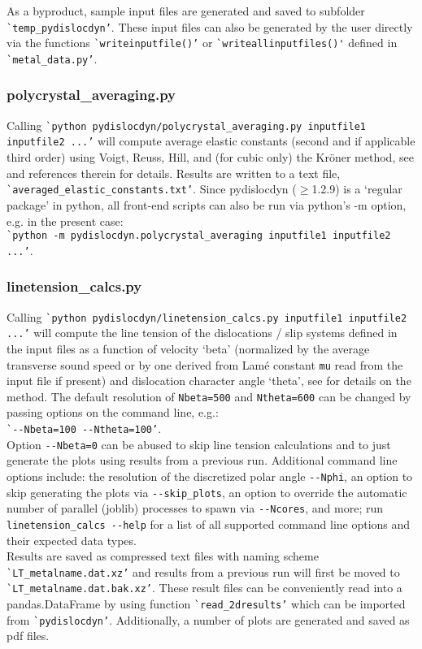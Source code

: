 \documentclass[11pt,letterpaper,oneside,pdftex]{article}
\begin{document}
As a byproduct, sample input files are generated and saved to subfolder \verb|`temp_pydislocdyn’|.
These input files can also be generated by the user directly via the functions \verb|`writeinputfile()’| or \verb|`writeallinputfiles()'| defined in \verb|`metal_data.py’|.


\subsubsection{polycrystal\_averaging.py}

Calling \verb|`python pydislocdyn/polycrystal_averaging.py inputfile1 inputfile2 ...’| will compute average elastic constants (second and if applicable third order) using Voigt, Reuss, Hill, and (for cubic only) the Kr{\"o}ner method, see \cite{Blaschke:2017Poly} and references therein for details.
Results are written to a text file,
\verb|`averaged_elastic_constants.txt’|.
Since pydislocdyn ($\ge$1.2.9) is a `regular package' in python, all front-end scripts can also be run via python's -m option, e.g. in the present case:\\
\verb|`python -m pydislocdyn.polycrystal_averaging inputfile1 inputfile2 ...’|.



\subsubsection{linetension\_calcs.py}

Calling \verb|`python pydislocdyn/linetension_calcs.py inputfile1 inputfile2 ...’| will compute the line tension of the dislocations / slip systems defined in the input files as a function of velocity ‘beta’ (normalized by the average transverse sound speed or by one derived from Lam\'e constant \verb|mu| read from the input file if present) and dislocation character angle ‘theta’, see \cite{Blaschke:2017lten} for details on the method.
The default resolution of \verb|Nbeta=500| and \verb|Ntheta=600| can be changed by passing options on the command line, e.g.:
\\\verb|`--Nbeta=100 --Ntheta=100’|.\\
Option \verb|--Nbeta=0| can be abused to skip line tension calculations and to just generate the plots using results from a previous run. 
Additional command line options include:
the resolution of the discretized polar angle \verb|--Nphi|,
an option to skip generating the plots via \verb|--skip_plots|,
an option to override the automatic number of parallel (joblib) processes to spawn via \verb|--Ncores|,
and more; run \verb|linetension_calcs --help| for a list of all supported command line options and their expected data types.
\\
Results are saved as compressed text files with naming scheme \verb|`LT_metalname.dat.xz’| and results from a previous run will first be moved to \verb|`LT_metalname.dat.bak.xz’|.
These result files can be conveniently read into a pandas.DataFrame by using function \verb|`read_2dresults’| which can be imported from \verb|`pydislocdyn’|.
Additionally, a number of plots are generated and saved as pdf files.
\end{document}
